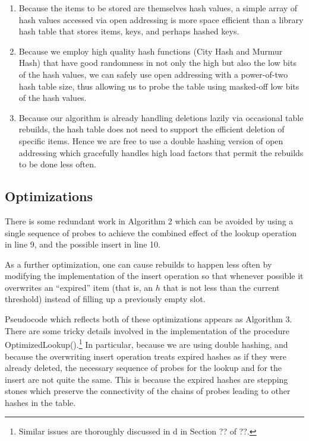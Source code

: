 \documentclass{sig-alternate}
\newenvironment{tighterenumerate}%
  {\begin{enumerate}%
    \setlength{\itemsep}{1pt}%
    \setlength{\parskip}{1pt}}%
  {\end{enumerate}}
\begin{document}
\begin{tighterenumerate}

\item Because the items to be stored are themselves hash values, a simple array of hash values accessed via open addressing is
more space efficient than a library hash table that stores items, keys, and perhaps hashed keys.
\item Because we employ high quality hash functions (City Hash and Murmur Hash)
that have good randomness in not only the high but also the low
bits of the hash values, we can safely use open addressing with a power-of-two hash table size, thus 
allowing us to probe the table using masked-off low bits of the hash values.
\item Because our algorithm is already handling deletions lazily via occasional table rebuilds,
the hash table does not need to support the efficient deletion of specific items. Hence we are
free to use a double hashing version of open addressing which gracefully handles high load factors
that permit the rebuilds to be done less often.
\end{tighterenumerate}

\subsection{Optimizations}

There is some redundant work in Algorithm 2 which can be avoided by
using a single sequence of probes to achieve the combined effect of
the lookup operation in line 9, and the possible insert in line 10.

As a further optimization, one can cause rebuilds to happen less often
by modifying the implementation of the insert operation so that
whenever possible it overwrites an ``expired'' item (that is, an $h$ that is
not less than the current threshold) instead of filling up a previously empty
slot. 

Pseudocode which reflects both of these optimizations appears as
Algorithm 3. There are some tricky details involved in the implementation
of the procedure OptimizedLookup().\footnote{Similar issues are thoroughly discussed in
d in Section ?? of ??.}
In particular, because we are using double hashing, and because the overwriting insert
operation treats expired hashes as if they were already deleted, the necessary
sequence of probes for the lookup and for the insert are not quite the same. This is
because the expired hashes are stepping stones
which preserve the connectivity of the chains of probes leading to other hashes in the table.
\end{document}
